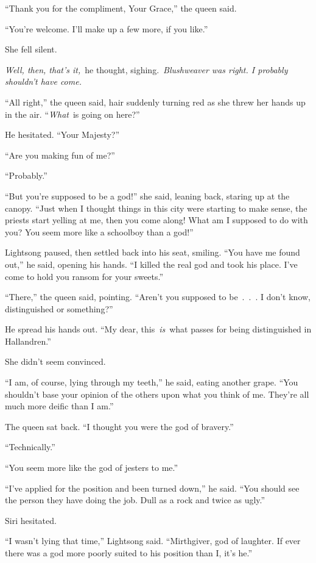 “Thank you for the compliment, Your Grace,” the queen said.

“You’re welcome. I’ll make up a few more, if you like.”

She fell silent.

\textit{Well, then, that’s it,}~he thought, sighing.~\textit{Blushweaver was right. I probably shouldn’t have come.}

“All right,” the queen said, hair suddenly turning red as she threw her hands up in the air. “\textit{What}~is going on here?”

He hesitated. “Your Majesty?”

“Are you making fun of me?”

“Probably.”

“But you’re supposed to be a god!” she said, leaning back, staring up at the canopy. “Just when I thought things in this city were starting to make sense, the priests start yelling at me, then you come along! What am I supposed to do with you? You seem more like a schoolboy than a god!”

Lightsong paused, then settled back into his seat, smiling. “You have me found out,” he said, opening his hands. “I killed the real god and took his place. I’ve come to hold you ransom for your sweets.”

“There,” the queen said, pointing. “Aren’t you supposed to be~.~.~. I don’t know, distinguished or something?”

He spread his hands out. “My dear, this~\textit{is}~what passes for being distinguished in Hallandren.”

She didn’t seem convinced.

“I am, of course, lying through my teeth,” he said, eating another grape. “You shouldn’t base your opinion of the others upon what you think of me. They’re all much more deific than I am.”

The queen sat back. “I thought you were the god of bravery.”

“Technically.”

“You seem more like the god of jesters to me.”

“I’ve applied for the position and been turned down,” he said. “You should see the person they have doing the job. Dull as a rock and twice as ugly.”

Siri hesitated.

“I wasn’t lying that time,” Lightsong said. “Mirthgiver, god of laughter. If ever there was a god more poorly suited to his position than I, it’s he.”

